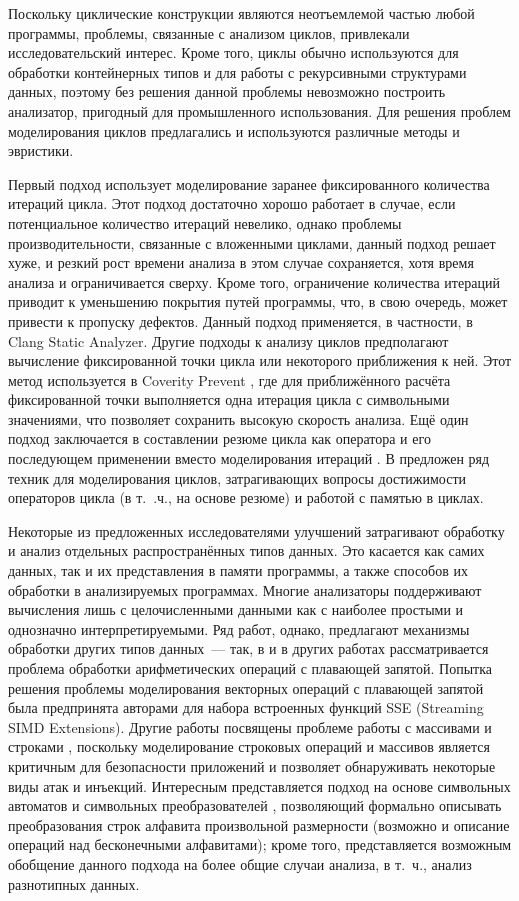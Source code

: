 Поскольку циклические конструкции являются неотъемлемой частью любой программы, проблемы, связанные с анализом циклов, привлекали исследовательский интерес. Кроме того, циклы обычно используются для обработки контейнерных типов и для работы с рекурсивными структурами данных, поэтому без решения данной проблемы невозможно построить анализатор, пригодный для промышленного использования. Для решения проблем моделирования циклов предлагались и используются различные методы и эвристики. 

Первый подход использует моделирование заранее фиксированного количества итераций цикла. Этот подход достаточно хорошо работает в случае, если потенциальное количество итераций невелико, однако проблемы производительности, связанные с вложенными циклами, данный подход решает хуже, и резкий рост времени анализа в этом случае сохраняется, хотя время анализа и ограничивается сверху. Кроме того, ограничение количества итераций приводит к уменьшению покрытия путей программы, что, в свою очередь, может привести к пропуску дефектов. Данный подход применяется, в частности, в Clang Static Analyzer. Другие подходы к анализу циклов предполагают вычисление фиксированной точки цикла или некоторого приближения к ней. Этот метод используется в Coverity Prevent \cite{coverity-billion}, где для приближённого расчёта фиксированной точки выполняется одна итерация цикла с символьными значениями, что позволяет сохранить высокую скорость анализа. Ещё один подход заключается в составлении резюме цикла как оператора и его последующем применении вместо моделирования итераций \cite{loopfrog-summary, godefroid-loop-summary}. В \cite{trtik-thesis} предложен ряд техник для моделирования циклов, затрагивающих вопросы достижимости операторов цикла (в т.~.ч., на основе резюме) и работой с памятью в циклах.

Некоторые из предложенных исследователями улучшений затрагивают обработку и анализ отдельных распространённых типов данных. Это касается как самих данных, так и их представления в памяти программы, а также способов их обработки в анализируемых программах. Многие анализаторы поддерживают вычисления лишь с целочисленными данными как с наиболее простыми и однозначно интерпретируемыми. Ряд работ, однако, предлагают механизмы обработки других типов данных~--- так, в \cite{sym-fp,sym-fp-dotnet} и в других работах рассматривается проблема обработки арифметических операций с плавающей запятой. Попытка решения проблемы моделирования векторных операций с плавающей запятой была предпринята авторами \cite{sym-fp-sse} для набора встроенных функций SSE (Streaming SIMD Extensions). Другие работы посвящены проблеме работы с массивами и строками \cite{str-csharp,str-sql}, поскольку моделирование строковых операций и массивов является критичным для безопасности приложений и позволяет обнаруживать некоторые виды атак и инъекций. Интересным представляется подход на основе символьных автоматов и символьных преобразователей \cite{sym-automata-appl,sym-automata-constraints}, позволяющий формально описывать преобразования строк алфавита произвольной размерности (возможно и описание операций над бесконечными алфавитами); кроме того, представляется возможным обобщение данного подхода на более общие случаи анализа, в т.~ч., анализ разнотипных данных.



